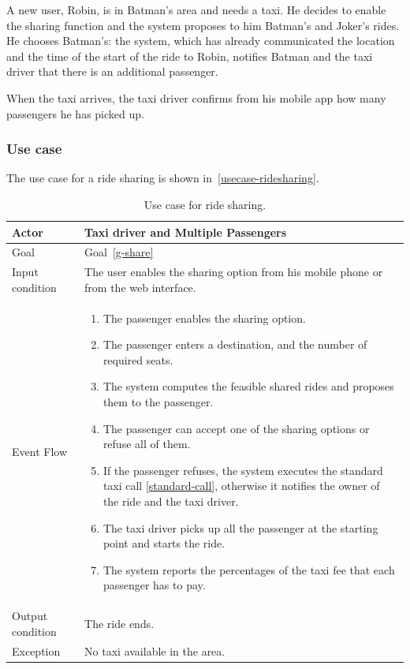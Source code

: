 A new user, Robin, is in Batman's area and needs a taxi. He decides to enable the sharing function and the system proposes to him Batman's and Joker's rides.
He chooses Batman's: the system, which has already communicated the location and the time of the start of the ride to Robin, notifies Batman and the taxi driver that there is an additional passenger.

When the taxi arrives, the taxi driver confirms from his mobile app how many passengers he has picked up.

\subsubsection{Use case}
The use case for a ride sharing is shown in~\autoref{usecase-ridesharing}.

\begin{table}
\begin{center}
\begin{tabular}{| l | p{} |}
\hline
Actor & Taxi driver and Multiple Passengers \\
\hline
Goal & Goal~\ref{g-share}
\\
\hline
Input condition & The user enables the sharing option from his mobile phone or from the web interface.  \\
\hline
Event Flow &
\begin{enumerate}
	\item The passenger enables the sharing option.
	\item The passenger enters a destination, and the number of required seats.
	\item The system computes the feasible shared rides and proposes them to the passenger.
	\item The passenger can accept one of the sharing options or refuse all of them.
	\item If the passenger refuses, the system executes the standard taxi call \ref{standard-call}, otherwise it notifies the owner of the ride and the taxi driver.
	\item The taxi driver picks up all the passenger at the starting point and starts the ride.
	\item The system reports the percentages of the taxi fee that each passenger has to pay.
\end{enumerate}
\\
\hline
Output condition & The ride ends. \\
\hline
Exception & No taxi available in the area. \\
\hline
\end{tabular}
\end{center}
\caption{Use case for ride sharing.}
\label{usecase-ridesharing}
\end{table}

